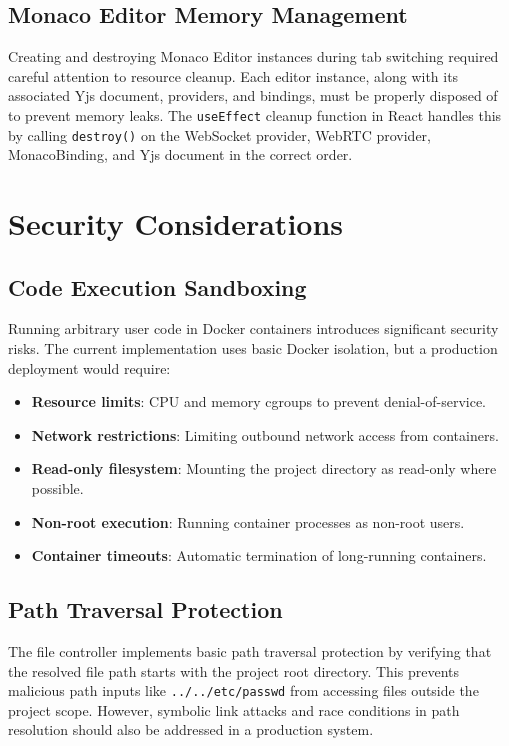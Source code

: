 \documentclass[12pt,a4paper,oneside]{report}
\begin{document}
\subsection{Monaco Editor Memory Management}

Creating and destroying Monaco Editor instances during tab switching required careful attention to resource cleanup. Each editor instance, along with its associated Yjs document, providers, and bindings, must be properly disposed of to prevent memory leaks. The \texttt{useEffect} cleanup function in React handles this by calling \texttt{destroy()} on the WebSocket provider, WebRTC provider, MonacoBinding, and Yjs document in the correct order.

\section{Security Considerations}

\subsection{Code Execution Sandboxing}

Running arbitrary user code in Docker containers introduces significant security risks. The current implementation uses basic Docker isolation, but a production deployment would require:

\begin{itemize}
    \item \textbf{Resource limits}: CPU and memory cgroups to prevent denial-of-service.
    \item \textbf{Network restrictions}: Limiting outbound network access from containers.
    \item \textbf{Read-only filesystem}: Mounting the project directory as read-only where possible.
    \item \textbf{Non-root execution}: Running container processes as non-root users.
    \item \textbf{Container timeouts}: Automatic termination of long-running containers.
\end{itemize}

\subsection{Path Traversal Protection}

The file controller implements basic path traversal protection by verifying that the resolved file path starts with the project root directory. This prevents malicious path inputs like \texttt{../../etc/passwd} from accessing files outside the project scope. However, symbolic link attacks and race conditions in path resolution should also be addressed in a production system.
\end{document}
